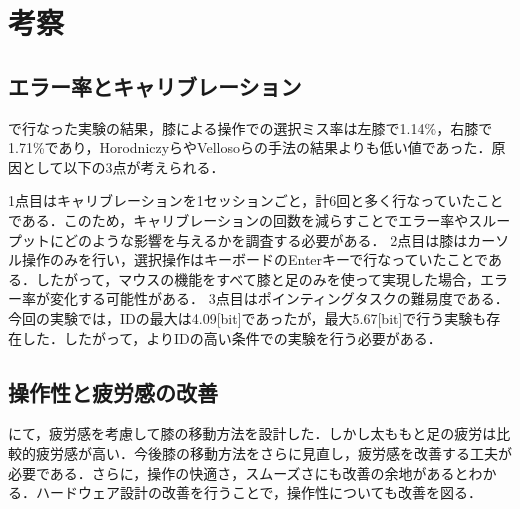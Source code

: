\section{考察}
\subsection{エラー率とキャリブレーション}
で行なった実験の結果，膝による操作での選択ミス率は左膝で1.14\%，右膝で1.71\%であり，Horodniczyら\cite{Horodniczy:2017:FHE:3025453.3025625}やVellosoら\cite{velloso:hal-01599657}の手法の結果よりも低い値であった．原因として以下の3点が考えられる．

1点目はキャリブレーションを1セッションごと，計6回と多く行なっていたことである．このため，キャリブレーションの回数を減らすことでエラー率やスループットにどのような影響を与えるかを調査する必要がある．
2点目は膝はカーソル操作のみを行い，選択操作はキーボードのEnterキーで行なっていたことである．したがって，マウスの機能をすべて膝と足のみを使って実現した場合，エラー率が変化する可能性がある．
3点目はポインティングタスクの難易度である．今回の実験では，IDの最大は4.09[bit]であったが，最大5.67[bit]で行う実験も存在した\cite{Horodniczy:2017:FHE:3025453.3025625, velloso:hal-01599657}．したがって，よりIDの高い条件での実験を行う必要がある．

\subsection{操作性と疲労感の改善}

にて，疲労感を考慮して膝の移動方法を設計した．しかし太ももと足の疲労は比較的疲労感が高い．今後膝の移動方法をさらに見直し，疲労感を改善する工夫が必要である．さらに，操作の快適さ，スムーズさにも改善の余地があるとわかる．ハードウェア設計の改善を行うことで，操作性についても改善を図る．




